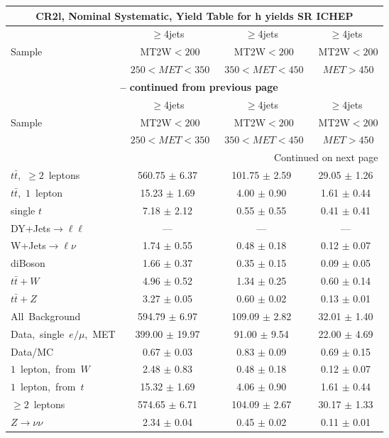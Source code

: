 \documentclass{article}
\begin{document}
\begin{longtable}{|l|c|c|c|} 
 
\multicolumn{4}{c}{ CR2l, Nominal Systematic, Yield Table for h yields SR ICHEP }\\* \hline 
  & $\ge$4jets  & $\ge$4jets  & $\ge$4jets \\* 
Sample  & ~MT2W$<200$  & ~MT2W$<200$  & ~MT2W$<200$ \\* 
  & ~$250<MET<350$  & ~$350<MET<450$  & ~$MET>450$ \\* 
\hline \hline 
\endfirsthead 
 
\multicolumn{4}{c}{{\bfseries \tablename\ \thetable{} -- continued from previous page}}\\* \hline 
  & $\ge$4jets  & $\ge$4jets  & $\ge$4jets \\* 
Sample  & ~MT2W$<200$  & ~MT2W$<200$  & ~MT2W$<200$ \\* 
  & ~$250<MET<350$  & ~$350<MET<450$  & ~$MET>450$ \\* 
\hline \hline 
\endhead 
 
\multicolumn{4}{|r|}{{Continued on next page}}\\* \hline 
\endfoot 
 
 
\endlastfoot 
 
$t\bar{t}$,~$\ge2$~leptons & 560.75 $\pm$ 6.37  & 101.75 $\pm$ 2.59  & 29.05 $\pm$ 1.26 \\* 
$t\bar{t}$,~$1$~lepton & 15.23 $\pm$ 1.69  & 4.00 $\pm$ 0.90  & 1.61 $\pm$ 0.44 \\* 
single $t$  & 7.18 $\pm$ 2.12  & 0.55 $\pm$ 0.55  & 0.41 $\pm$ 0.41 \\* 
DY+Jets$\rightarrow\ell\ell$  & ---  & ---  & --- \\* 
W+Jets$\rightarrow\ell\nu$  & 1.74 $\pm$ 0.55  & 0.48 $\pm$ 0.18  & 0.12 $\pm$ 0.07 \\* 
diBoson  & 1.66 $\pm$ 0.37  & 0.35 $\pm$ 0.15  & 0.09 $\pm$ 0.05 \\* 
$t\bar{t}+W$  & 4.96 $\pm$ 0.52  & 1.34 $\pm$ 0.25  & 0.60 $\pm$ 0.14 \\* 
$t\bar{t}+Z$  & 3.27 $\pm$ 0.05  & 0.60 $\pm$ 0.02  & 0.13 $\pm$ 0.01 \\* 
\hline \hline 
All~Background  & 594.79 $\pm$ 6.97  & 109.09 $\pm$ 2.82  & 32.01 $\pm$ 1.40 \\* 
Data,~single~$e/\mu$,~MET  & 399.00 $\pm$ 19.97  & 91.00 $\pm$ 9.54  & 22.00 $\pm$ 4.69 \\* 
Data/MC  & 0.67 $\pm$ 0.03  & 0.83 $\pm$ 0.09  & 0.69 $\pm$ 0.15 \\* 
\hline \hline 
$1$~lepton,~from~$W$  & 2.48 $\pm$ 0.83  & 0.48 $\pm$ 0.18  & 0.12 $\pm$ 0.07 \\* 
$1$~lepton,~from~$t$  & 15.32 $\pm$ 1.69  & 4.06 $\pm$ 0.90  & 1.61 $\pm$ 0.44 \\* 
$\ge2$~leptons  & 574.65 $\pm$ 6.71  & 104.09 $\pm$ 2.67  & 30.17 $\pm$ 1.33 \\* 
$Z\rightarrow\nu\nu$  & 2.34 $\pm$ 0.04  & 0.45 $\pm$ 0.02  & 0.11 $\pm$ 0.01 \\* 
\hline 
\end{longtable} 
\end{document}

